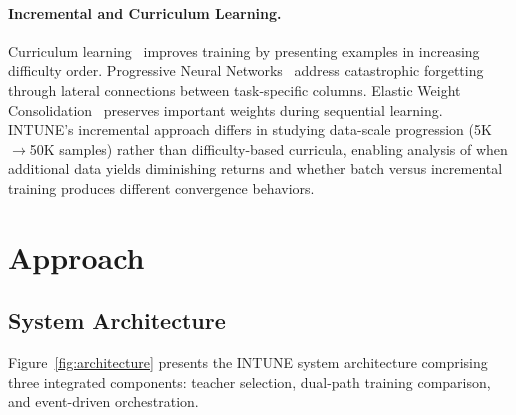 \documentclass[sigconf]{acmart}
\begin{document}
\paragraph{Incremental and Curriculum Learning.}
Curriculum learning~\cite{bengio2009curriculum} improves training by presenting examples in increasing difficulty order. Progressive Neural Networks~\cite{rusu2016progressive} address catastrophic forgetting through lateral connections between task-specific columns. Elastic Weight Consolidation~\cite{kirkpatrick2017overcoming} preserves important weights during sequential learning. INTUNE's incremental approach differs in studying data-scale progression (5K$\rightarrow$50K samples) rather than difficulty-based curricula, enabling analysis of when additional data yields diminishing returns and whether batch versus incremental training produces different convergence behaviors.

\section{Approach}

\subsection{System Architecture}

Figure~\ref{fig:architecture} presents the INTUNE system architecture comprising three integrated components: teacher selection, dual-path training comparison, and event-driven orchestration.
\end{document}
